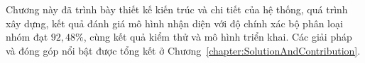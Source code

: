 \documentclass[../DoAn.tex]{subfiles}
\begin{document}

Chương này đã trình bày thiết kế kiến trúc và chi tiết của hệ thống, quá trình xây dựng, kết quả đánh giá mô hình nhận diện với độ chính xác bộ phân loại nhóm đạt $92{,}48\%$, cùng kết quả kiểm thử và mô hình triển khai. Các giải pháp và đóng góp nổi bật được tổng kết ở Chương~\ref{chapter:SolutionAndContribution}.
\end{document}
